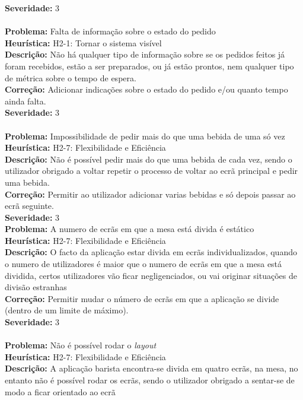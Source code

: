\documentclass{article}
\begin{document}
\textbf{Severidade:} 3\\
\\
\textbf{Problema:} Falta de informação sobre o estado do pedido\\
\textbf{Heurística:} H2-1: Tornar o sistema visível\\
\textbf{Descrição:} Não há qualquer tipo de informação sobre se os pedidos feitos já foram recebidos, estão a ser preparados, ou já estão prontos, nem qualquer tipo de métrica sobre o tempo de espera.\\
\textbf{Correção:} Adicionar indicações sobre o estado do pedido e/ou quanto tempo ainda falta.\\
\textbf{Severidade:} 3\\
\\
\textbf{Problema:} Impossibilidade de pedir mais do que uma bebida de uma só vez\\
\textbf{Heurística:} H2-7: Flexibilidade e Eficiência\\
\textbf{Descrição:} Não é possível pedir mais do que uma bebida de cada vez, sendo o utilizador obrigado a voltar repetir o processo de voltar ao ecrã principal e pedir uma bebida.\\
\textbf{Correção:} Permitir ao utilizador adicionar varias bebidas e só depois passar ao ecrã seguinte.\\
\textbf{Severidade:} 3\\
\clearpage
\noindent\textbf{Problema:} A numero de ecrãs em que a mesa está divida é estático\\
\textbf{Heurística:} H2-7: Flexibilidade e Eficiência\\
\textbf{Descrição:} O facto da aplicação estar divida em ecrãs individualizados, quando o numero de utilizadores é maior que o numero de ecrãs em que a mesa está dividida, certos utilizadores vão ficar negligenciados, ou vai originar situações de divisão estranhas\\
\textbf{Correção:} Permitir mudar o número de ecrãs em que a aplicação se divide (dentro de um limite de máximo).\\
\textbf{Severidade:} 3\\
\\
\textbf{Problema:} Não é possível rodar o \textit{layout}\\
\textbf{Heurística:} H2-7: Flexibilidade e Eficiência\\
\textbf{Descrição:} A aplicação barista encontra-se divida em quatro ecrãs, na mesa, no entanto não é possível rodar os ecrãs, sendo o utilizador obrigado a sentar-se de modo a ficar orientado ao ecrã\\
\end{document}
